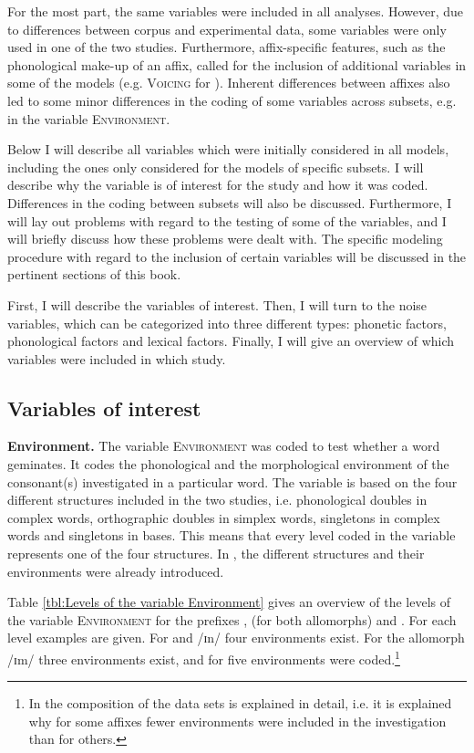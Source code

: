 For the most part, the same variables were included in all analyses. However, due to differences between corpus and experimental data, some variables were only used in one of the two studies. 
 Furthermore, affix-specific features, such as the phonological make-up of an affix, called for the inclusion of additional variables in some of the models (e.g. \textsc{Voicing} for ). Inherent differences between affixes also led to some minor differences in the coding of some variables across subsets, e.g. in the variable \textsc{Environment}. 
 
Below I will describe all variables which were initially considered in all models, including the ones only considered for the models of specific subsets. I will describe why the variable is of interest for the study and how it was coded. Differences in the coding between subsets will also be discussed. Furthermore, I will lay out  problems with regard to the testing of some of the variables, and I will briefly discuss how these problems were dealt with. The specific modeling procedure with regard to the inclusion of certain variables will be discussed in the pertinent sections of this book.


First, I will describe the variables of interest. Then, I will turn to the noise variables, which can be categorized  into three different types: phonetic factors, phonological factors and lexical factors.  Finally, I will give an overview of which variables were included in which study. 

\subsection{Variables of interest} \label{variables of interest}

\textbf{Environment.}  The variable \textsc{Environment} was coded to test whether a word geminates. It codes the phonological and the morphological environment of the consonant(s) investigated in a particular word. The variable is based on the four different structures included in the two studies,  i.e. phonological doubles in complex words, orthographic doubles in simplex words, singletons in complex words and singletons in bases. This means that every level coded in the variable represents one of the four structures. In , the different structures and their environments were already introduced. %
 
 Table \ref{tbl:Levels of the variable Environment} gives an overview of the levels of the variable \textsc{Environment} for the prefixes ,  (for both allomorphs) and . For each level examples are given.
 For  and /ɪn/ four environments exist. For the allomorph /ɪm/ three environments exist, and for  five environments were coded.\footnote{In  the composition of the data sets is explained in detail, i.e. it is explained why for some affixes fewer environments were included in the investigation than for others.}
 

